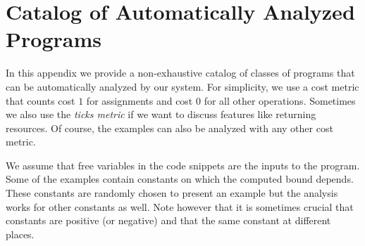 \documentclass[nocopyrightspace,preprint]{sigplanconf}
\begin{document}






\clearpage
\appendix

\section{Catalog of Automatically Analyzed Programs}
\label{app:cat}

In this appendix we provide a non-exhaustive catalog of classes of
programs that can be automatically analyzed by our system.  For
simplicity, we use a cost metric that counts cost $1$ for assignments
and cost $0$ for all other operations.  Sometimes we also use the
\emph{ticks metric} if we want to discuss features like returning
resources.  Of course, the examples can also be analyzed with any other
cost metric.

We assume that free variables in the code snippets are the inputs to
the program. Some of the examples contain constants on which the
computed bound depends.  These constants are randomly chosen to
present an example but the analysis works for other constants as well.
Note however that it is sometimes crucial that constants are positive
(or negative) and that the same constant at different places.
\end{document}
